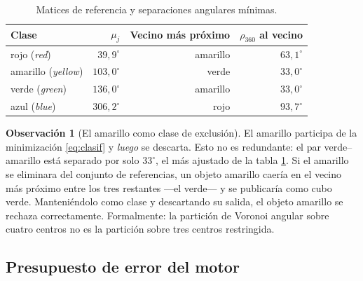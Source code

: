 \documentclass[11pt,a4paper]{article}
\theoremstyle{definition}
\newtheorem{observacion}[teorema]{Observación}
\newcommand{\grados}{^{\circ}}
\begin{document}
\begin{table}[htbp]
\centering
\caption{Matices de referencia y separaciones angulares mínimas.}
\begin{tabular}{lrrr}
\toprule
Clase & $\mu_j$ & Vecino más próximo & $\rho_{360}$ al vecino \\
\midrule
rojo (\textit{red})       & $39{,}9\grados$  & amarillo & $63{,}1\grados$ \\
amarillo (\textit{yellow})& $103{,}0\grados$ & verde    & $33{,}0\grados$ \\
verde (\textit{green})    & $136{,}0\grados$ & amarillo & $33{,}0\grados$ \\
azul (\textit{blue})      & $306{,}2\grados$ & rojo     & $93{,}7\grados$ \\
\bottomrule
\end{tabular}
\label{tab:matices}
\end{table}

\begin{observacion}[El amarillo como clase de exclusión]
El amarillo participa de la minimización \eqref{eq:clasif} y \emph{luego} se descarta.
Esto no es redundante: el par verde--amarillo está separado por solo $33\grados$, el
más ajustado de la tabla \ref{tab:matices}. Si el amarillo se eliminara del conjunto de
referencias, un objeto amarillo caería en el vecino más próximo entre los tres
restantes ---el verde--- y se publicaría como cubo verde. Manteniéndolo como clase y
descartando su salida, el objeto amarillo se rechaza correctamente. Formalmente: la
partición de Voronoi angular sobre cuatro centros no es la partición sobre tres centros
restringida.
\end{observacion}

\subsection{Presupuesto de error del motor}
\label{sec:error-vision}
\end{document}
